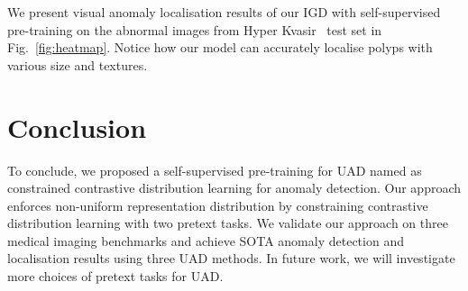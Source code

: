 \documentclass[runningheads]{llncs}
\begin{document}
We present visual anomaly localisation results of our IGD with self-supervised pre-training on the abnormal images from Hyper Kvasir~\cite{borgli2020hyperkvasir} test set in Fig.~\ref{fig:heatmap}. Notice how our model can accurately localise  polyps with various size and textures.





\section{Conclusion}

To conclude, we proposed a self-supervised pre-training for UAD named as constrained contrastive distribution learning for anomaly detection. Our approach enforces non-uniform representation distribution by constraining contrastive distribution learning with two pretext tasks. We validate our approach on three medical imaging benchmarks and achieve SOTA anomaly detection and localisation results using three UAD methods. In future work, we will investigate more choices of pretext tasks for UAD.





\end{document}
